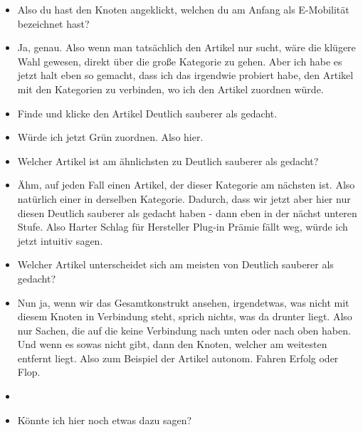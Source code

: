 {\begin{itemize}[]
                  Nö, eben nicht.
                  Unlucky.
                  Also ich wollte es jetzt so spezifisch wie möglich machen.
                  Ich könnte natürlich auch hier lang, also den Knoten anklicken und dann schauen, wo der Artikel ist.
            \item {} Also du hast den Knoten angeklickt, welchen du am Anfang als E-Mobilität bezeichnet hast?
            \item {} Ja, genau.
                  Also wenn man tatsächlich den Artikel nur sucht, wäre die klügere Wahl gewesen, direkt über die große Kategorie zu gehen.
                  Aber ich habe es jetzt halt eben so gemacht, dass ich das irgendwie probiert habe, den Artikel mit den Kategorien zu verbinden, wo ich den Artikel zuordnen würde.
            \item {} Finde und klicke den Artikel \flqq Deutlich sauberer als gedacht\frqq{}.
            \item {} Würde ich jetzt Grün zuordnen. Also hier.
            \item {} Welcher Artikel ist am ähnlichsten zu \flqq Deutlich sauberer als gedacht\frqq{}?
            \item {} Ähm, auf jeden Fall einen Artikel, der dieser Kategorie am nächsten ist.
                  Also natürlich einer in derselben Kategorie.
                  Dadurch, dass wir jetzt aber hier nur diesen \flqq Deutlich sauberer als gedacht\frqq{} haben - dann eben in der nächst unteren Stufe.
                  Also \flqq Harter Schlag für Hersteller Plug-in Prämie fällt weg\frqq{}, würde ich jetzt intuitiv sagen.
            \item {} Welcher Artikel unterscheidet sich am meisten von \flqq Deutlich sauberer als gedacht\frqq{}?
            \item {} Nun ja, wenn wir das Gesamtkonstrukt ansehen, irgendetwas, was nicht mit diesem Knoten in Verbindung steht, sprich nichts, was da drunter liegt.
                  Also nur Sachen, die auf die keine Verbindung nach unten oder nach oben haben.
                  Und wenn es sowas nicht gibt, dann den Knoten, welcher am weitesten entfernt liegt.
                  Also zum Beispiel der Artikel \flqq autonom. Fahren Erfolg oder Flop\frqq{}.
            \item {}
            \item {} Könnte ich hier noch etwas dazu sagen?

\end{itemize}}
